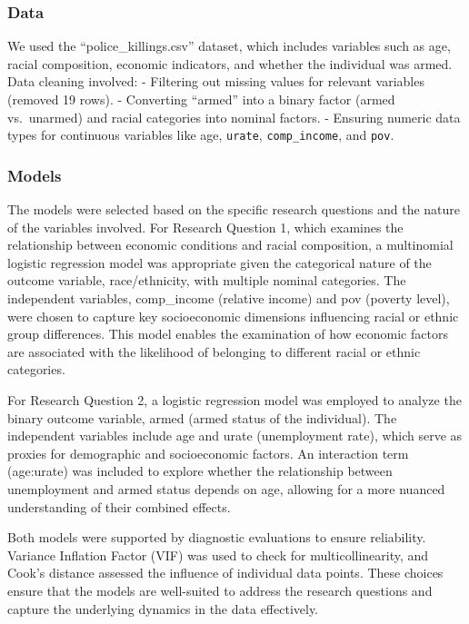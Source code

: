 \documentclass[
  letterpaper,
  DIV=11,
  numbers=noendperiod]{scrartcl}
\begin{document}
\subsubsection{Data}\label{data}

We used the ``police\_killings.csv'' dataset, which includes variables
such as age, racial composition, economic indicators, and whether the
individual was armed. Data cleaning involved: - Filtering out missing
values for relevant variables (removed 19 rows). - Converting ``armed''
into a binary factor (armed vs.~unarmed) and racial categories into
nominal factors. - Ensuring numeric data types for continuous variables
like age, \texttt{urate}, \texttt{comp\_income}, and \texttt{pov}.

\subsubsection{Models}\label{models}

The models were selected based on the specific research questions and
the nature of the variables involved. For Research Question 1, which
examines the relationship between economic conditions and racial
composition, a multinomial logistic regression model was appropriate
given the categorical nature of the outcome variable, race/ethnicity,
with multiple nominal categories. The independent variables,
comp\_income (relative income) and pov (poverty level), were chosen to
capture key socioeconomic dimensions influencing racial or ethnic group
differences. This model enables the examination of how economic factors
are associated with the likelihood of belonging to different racial or
ethnic categories.

For Research Question 2, a logistic regression model was employed to
analyze the binary outcome variable, armed (armed status of the
individual). The independent variables include age and urate
(unemployment rate), which serve as proxies for demographic and
socioeconomic factors. An interaction term (age:urate) was included to
explore whether the relationship between unemployment and armed status
depends on age, allowing for a more nuanced understanding of their
combined effects.

Both models were supported by diagnostic evaluations to ensure
reliability. Variance Inflation Factor (VIF) was used to check for
multicollinearity, and Cook's distance assessed the influence of
individual data points. These choices ensure that the models are
well-suited to address the research questions and capture the underlying
dynamics in the data effectively.
\end{document}
